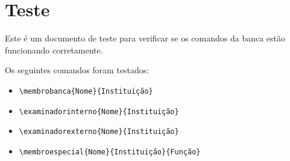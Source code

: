 \documentclass[mestrado]{UnB-PPGT}
\begin{document}

\textual
\chapter{Teste}

Este é um documento de teste para verificar se os comandos da banca estão funcionando corretamente.

Os seguintes comandos foram testados:
\begin{itemize}
\item \texttt{\textbackslash membrobanca\{Nome\}\{Instituição\}}
\item \texttt{\textbackslash examinadorinterno\{Nome\}\{Instituição\}}
\item \texttt{\textbackslash examinadorexterno\{Nome\}\{Instituição\}}
\item \texttt{\textbackslash membroespecial\{Nome\}\{Instituição\}\{Função\}}
\end{itemize}
\end{document}

